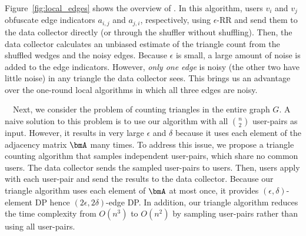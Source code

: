Figure~\ref{fig:local_edges} shows the overview of \AlgWSLE{}. 
In this algorithm, users $v_i$ and $v_j$ obfuscate edge indicators $a_{i,j}$ and $a_{j,i}$, respectively, using $\epsilon$-RR and send them to the data collector directly (or through the shuffler without shuffling). 
Then, the data collector calculates an unbiased estimate of the triangle count 
from the shuffled wedges and the noisy edges. 
Because $\epsilon$ is small, a large amount of noise is added to the edge indicators. 
However, \textit{only one edge} is noisy (the other two have little noise) in any triangle the data collector sees. 
This brings us an advantage over the one-round local algorithms in which all three edges are noisy. 

\smallskip
{}~~Next, we consider the problem of counting triangles in the entire graph $G$. 
A naive solution to this problem is to use our 
\AlgWSLE{} algorithm 
with all $\binom{n}{2}$ user-pairs as input. 
However, it results in very large $\epsilon$ and $\delta$ because it uses each element of the adjacency matrix $\bmA$ many times. 
To address this issue, 
we propose a triangle counting algorithm that samples 
independent user-pairs, which share no common users. 
The data collector sends the sampled user-pairs to users. 
Then, users apply 
\AlgWSLE{} 
with each user-pair 
and send the results to the data collector. 
Because our triangle algorithm uses each element of 
$\bmA$ at most once, it provides $(\epsilon,\delta)$-element DP hence $(2\epsilon,2\delta)$-edge DP. 
In addition, our triangle algorithm reduces the time complexity from $O(n^3)$ to $O(n^2)$ by sampling user-pairs rather than using all user-pairs. 

